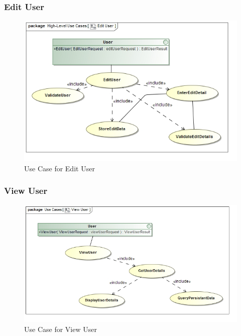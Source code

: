 \documentclass[a4paper,10pt]{article}
\begin{document}
\subsubsection{Edit User}
	\begin{figure}[H]
		\includegraphics[scale=0.5]{UseEditUser}
	\caption{Use Case for Edit User}
	\end{figure}
		
\subsubsection{View User}
	\begin{figure}[H]
		\includegraphics[scale=0.5]{UseViewUser}
	\caption{Use Case for View User}
	\end{figure}
		
\end{document}
